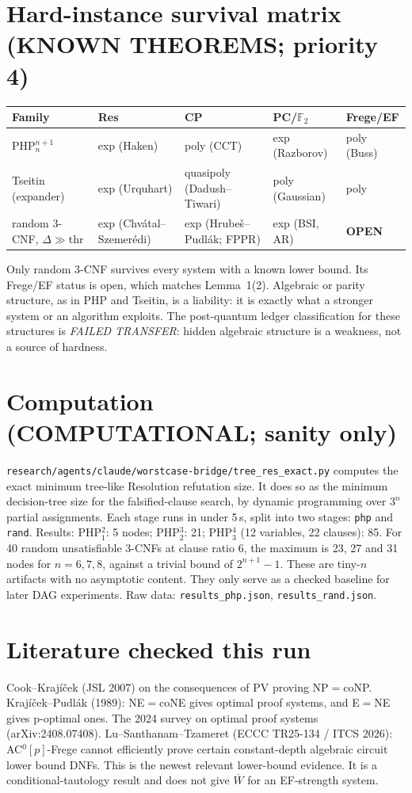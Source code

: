 \documentclass[11pt]{article}
\begin{document}
\section{Hard-instance survival matrix (KNOWN THEOREMS; priority 4)}
\begin{tabular}{@{}lllll@{}}\toprule
Family & Res & CP & PC/$\mathbb F_2$ & Frege/EF\\\midrule
PHP$^{n+1}_n$ & exp (Haken) & poly (CCT) & exp (Razborov) & poly (Buss)\\
Tseitin (expander) & exp (Urquhart) & quasipoly (Dadush--Tiwari) & poly (Gaussian) & poly\\
random 3-CNF, $\Delta\gg$thr & exp (Chvátal--Szemerédi) & exp (Hrubeš--Pudlák; FPPR) & exp (BSI, AR) & \textbf{OPEN}\\\bottomrule
\end{tabular}

\noindent Only random 3-CNF survives every system with a known lower bound.
Its Frege/EF status is open, which matches Lemma~1(2).
Algebraic or parity structure, as in PHP and Tseitin, is a liability: it is exactly what a stronger system or an algorithm exploits.
The post-quantum ledger classification for these structures is \emph{FAILED TRANSFER}: hidden algebraic structure is a weakness, not a source of hardness.

\section{Computation (COMPUTATIONAL; sanity only)}
\texttt{research/agents/claude/worstcase-bridge/tree\_res\_exact.py} computes the exact minimum tree-like Resolution refutation size.
It does so as the minimum decision-tree size for the falsified-clause search, by dynamic programming over $3^n$ partial assignments.
Each stage runs in under 5\,s, split into two stages: \texttt{php} and \texttt{rand}.
Results: PHP$^2_1$: 5 nodes; PHP$^3_2$: 21; PHP$^4_3$ (12 variables, 22 clauses): 85.
For 40 random unsatisfiable 3-CNFs at clause ratio 6, the maximum is 23, 27 and 31 nodes for $n=6,7,8$, against a trivial bound of $2^{n+1}-1$.
These are tiny-$n$ artifacts with no asymptotic content. They only serve as a checked baseline for later DAG experiments.
Raw data: \texttt{results\_php.json}, \texttt{results\_rand.json}.

\section{Literature checked this run}
Cook--Krajíček (JSL 2007) on the consequences of PV proving NP$=$coNP.
Krajíček--Pudlák (1989): NE$=$coNE gives optimal proof systems, and E$=$NE gives p-optimal ones.
The 2024 survey on optimal proof systems (arXiv:2408.07408).
Lu--Santhanam--Tzameret (ECCC TR25-134 / ITCS 2026): AC$^0[p]$-Frege cannot efficiently prove certain constant-depth algebraic circuit lower bound DNFs.
This is the newest relevant lower-bound evidence. It is a conditional-tautology result and does not give $\overline W$ for an EF-strength system.
\end{document}

